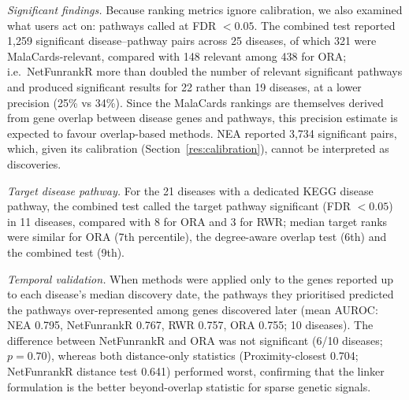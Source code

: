 \emph{Significant findings.} Because ranking metrics ignore calibration, we also examined what users act on: pathways called at FDR $<0.05$. The combined test reported 1{,}259 significant disease--pathway pairs across 25 diseases, of which 321 were MalaCards-relevant, compared with 148 relevant among 438 for ORA; i.e.\ NetFunrankR more than doubled the number of relevant significant pathways and produced significant results for 22 rather than 19 diseases, at a lower precision (25\% vs 34\%). Since the MalaCards rankings are themselves derived from gene overlap between disease genes and pathways, this precision estimate is expected to favour overlap-based methods. NEA reported 3{,}734 significant pairs, which, given its calibration (Section~\ref{res:calibration}), cannot be interpreted as discoveries.

\emph{Target disease pathway.} For the 21 diseases with a dedicated KEGG disease pathway, the combined test called the target pathway significant (FDR $<0.05$) in 11 diseases, compared with 8 for ORA and 3 for RWR; median target ranks were similar for ORA (7th percentile), the degree-aware overlap test (6th) and the combined test (9th).

\emph{Temporal validation.} When methods were applied only to the genes reported up to each disease's median discovery date, the pathways they prioritised predicted the pathways over-represented among genes discovered later (mean AUROC: NEA 0.795, NetFunrankR 0.767, RWR 0.757, ORA 0.755; 10 diseases). The difference between NetFunrankR and ORA was not significant (6/10 diseases; $p = 0.70$), whereas both distance-only statistics (Proximity-closest 0.704; NetFunrankR distance test 0.641) performed worst, confirming that the linker formulation is the better beyond-overlap statistic for sparse genetic signals.

